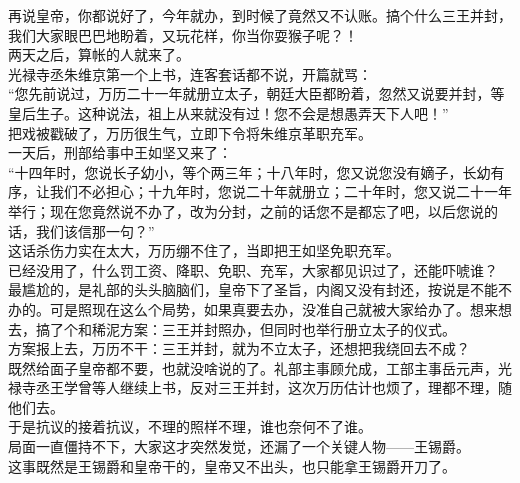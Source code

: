 \begin{multicols}{\theparacolNo}
再说皇帝，你都说好了，今年就办，到时候了竟然又不认账。搞个什么三王并封，我们大家眼巴巴地盼着，又玩花样，你当你耍猴子呢？！\\

两天之后，算帐的人就来了。\\

光禄寺丞朱维京第一个上书，连客套话都不说，开篇就骂：\\

“您先前说过，万历二十一年就册立太子，朝廷大臣都盼着，忽然又说要并封，等皇后生子。这种说法，祖上从来就没有过！您不会是想愚弄天下人吧！”\\

把戏被戳破了，万历很生气，立即下令将朱维京革职充军。\\

一天后，刑部给事中王如坚又来了：\\

“十四年时，您说长子幼小，等个两三年；十八年时，您又说您没有嫡子，长幼有序，让我们不必担心；十九年时，您说二十年就册立；二十年时，您又说二十一年举行；现在您竟然说不办了，改为分封，之前的话您不是都忘了吧，以后您说的话，我们该信那一句？”\\

这话杀伤力实在太大，万历绷不住了，当即把王如坚免职充军。\\

已经没用了，什么罚工资、降职、免职、充军，大家都见识过了，还能吓唬谁？\\

最尴尬的，是礼部的头头脑脑们，皇帝下了圣旨，内阁又没有封还，按说是不能不办的。可是照现在这么个局势，如果真要去办，没准自己就被大家给办了。想来想去，搞了个和稀泥方案：三王并封照办，但同时也举行册立太子的仪式。\\

方案报上去，万历不干：三王并封，就为不立太子，还想把我绕回去不成？\\

既然给面子皇帝都不要，也就没啥说的了。礼部主事顾允成，工部主事岳元声，光禄寺丞王学曾等人继续上书，反对三王并封，这次万历估计也烦了，理都不理，随他们去。\\

于是抗议的接着抗议，不理的照样不理，谁也奈何不了谁。\\

局面一直僵持不下，大家这才突然发觉，还漏了一个关键人物——王锡爵。\\

这事既然是王锡爵和皇帝干的，皇帝又不出头，也只能拿王锡爵开刀了。\\


\end{multicols}
